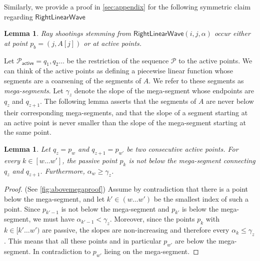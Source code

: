 \documentclass[10pt,a4paper]{article}
\newtheorem{lemma}[theorem]{Lemma}
\newcommand{\RLW}{\mathsf{RightLinearWave}}
\renewcommand{\P}{\mathcal{P}}
\newcommand{\AP}{\P_{\mathsf{active}}}
\begin{document}
Similarly, we provide a proof in \cref{sec:appendix} for the following symmetric claim regarding $\RLW$
\begin{lemma}\label{lem:activeraysright}
Ray shootings stemming from $\RLW(i,j,\alpha)$ occur either at point $p_b=(j,A[j])$ or at active points.
\end{lemma}

Let $\AP = q_1,q_2 \ldots$ be the restriction of the sequence $\P$ to the active points. 
We can think of the active points as defining a piecewise linear function whose segments are a coarsening of the segments of $A$. We refer to these segments as {\em mega-segments}. 
Let $\gamma_z$ denote the slope of the mega-segment whose endpoints are $q_z$ and $q_{z+1}$. 
The following lemma asserts that the segments of $A$ are never below their corresponding mega-segments, and that the slope of a segment starting at an active point is never smaller than the slope of the mega-segment starting at the same point. 

\begin{lemma} \label{lem:above-mega}
Let $q_z = p_w$ and $q_{z+1} = p_{w'}$ be two consecutive active points.
For every $k \in [w \ldots w']$, the passive point $p_k$ is not below the mega-segment connecting $q_z$ and $q_{z+1}$.
Furthermore, $\alpha_w \ge \gamma_z$.
\end{lemma}
\begin{proof}
(See \cref{fig:abovemegaproof}) Assume by contradiction that there is a point below the mega-segment, and let $k'\in (w\ldots w')$ be the smallest index of such a point.
Since $p_{k'-1}$ is not below the mega-segment and $p_{k'}$ is below the mega-segment, we must have $\alpha_{k'-1} < \gamma_z$.
Moreover, since the points $p_k$ with $k \in [k' \ldots w')$ are passive, the slopes are non-increasing and therefore every $\alpha_k \leq \gamma_z$.
This means that all these points and in particular $p_{w'}$ are below the mega-segment. In contradiction to $p_{w'}$ lieing on the mega-segment.
\end{proof}
\end{document}
